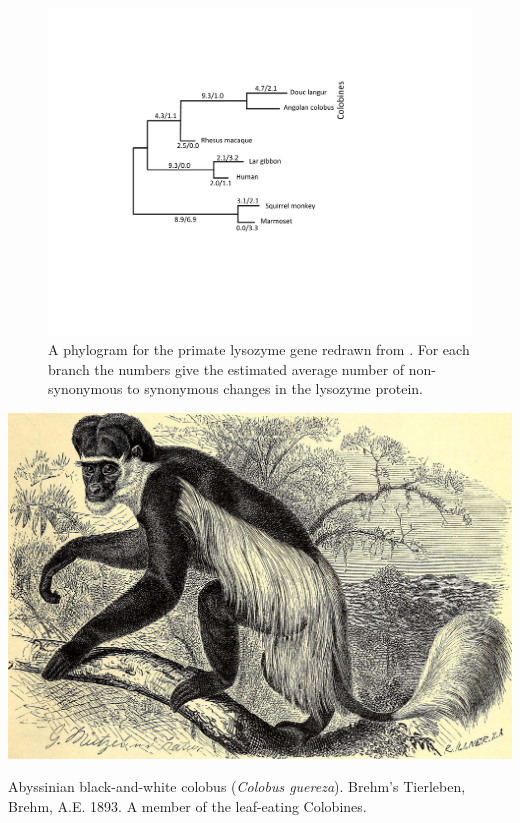 \begin{figure}
\begin{center}
\includegraphics[width=0.8 \textwidth]{Journal_figs/genetic_drift/Yang_lysozyme/Yang_lysozyme.pdf}
\end{center}
\caption{A phylogram for the primate lysozyme gene redrawn from
  \citeauthor{Yang:98}. For each branch the numbers give the estimated average
number of non-synonymous to synonymous changes in the lysozyme protein.} \label{fig:lysozyme}  
\end{figure} 

\begin{marginfigure}
\begin{center}
\includegraphics[width=0.8 \textwidth]{illustration_images/Genetic_drift/Colobus/19792029373_fcce706e67_k.jpg}
\end{center}
\caption{Abyssinian black-and-white colobus ({\it Colobus guereza}). Brehm's Tierleben,  Brehm,
  A.E. 1893. A member of the leaf-eating Colobines.} \label{fig:Colobus}  
\end{marginfigure} 

